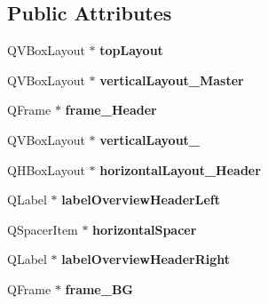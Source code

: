 \subsection*{Public Attributes}
\begin{DoxyCompactItemize}
\item 
\mbox{\label{class_ui___masternode_list_a2b277a99048cff11dbb3e3a666332b96}} 
Q\+V\+Box\+Layout $\ast$ {\bfseries top\+Layout}
\item 
\mbox{\label{class_ui___masternode_list_abb253ed2fed8a437364abc58f92274bf}} 
Q\+V\+Box\+Layout $\ast$ {\bfseries vertical\+Layout\+\_\+\+Master}
\item 
\mbox{\label{class_ui___masternode_list_a68dd6e25fb96cc46aa279be999c44870}} 
Q\+Frame $\ast$ {\bfseries frame\+\_\+\+Header}
\item 
\mbox{\label{class_ui___masternode_list_a373ae7d9b86de7eaeda2b7090b4d02e3}} 
Q\+V\+Box\+Layout $\ast$ {\bfseries vertical\+Layout\+\_}
\item 
\mbox{\label{class_ui___masternode_list_aa689f14562666e3c9b32c8cf357e4758}} 
Q\+H\+Box\+Layout $\ast$ {\bfseries horizontal\+Layout\+\_\+\+Header}
\item 
\mbox{\label{class_ui___masternode_list_ad16e1d53995497515277f5e976263938}} 
Q\+Label $\ast$ {\bfseries label\+Overview\+Header\+Left}
\item 
\mbox{\label{class_ui___masternode_list_a7c3c412ffeec1886f6daf83620f87964}} 
Q\+Spacer\+Item $\ast$ {\bfseries horizontal\+Spacer}
\item 
\mbox{\label{class_ui___masternode_list_a14351d031c2d343d41849c3726e1b6f8}} 
Q\+Label $\ast$ {\bfseries label\+Overview\+Header\+Right}
\item 
\mbox{\label{class_ui___masternode_list_addf42e30e859ab6a264f01039efd3f11}} 
Q\+Frame $\ast$ {\bfseries frame\+\_\+\+BG}
\item 
\mbox{\label{class_ui___masternode_list_a9c0d97e09ac64b7e941d541d00c7a0e8}} 

\end{DoxyCompactItemize}
